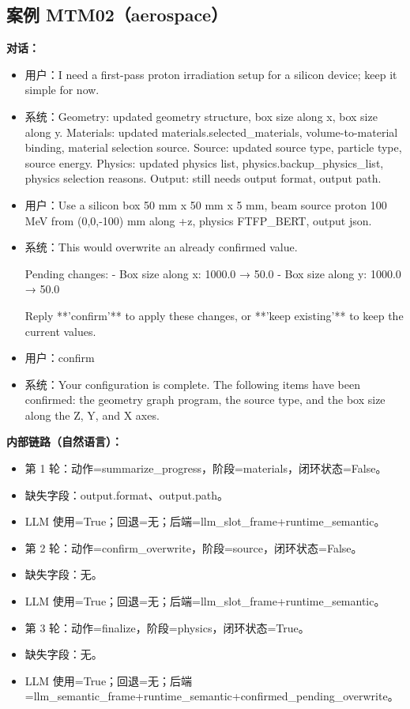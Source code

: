 \documentclass[11pt]{ctexart}
\begin{document}
\subsection{案例 MTM02（aerospace）}
\textbf{对话：}
\begin{itemize}
\item 用户：I need a first-pass proton irradiation setup for a silicon device; keep it simple for now.
\item 系统：Geometry: updated geometry structure, box size along x, box size along y. Materials: updated materials.selected\_materials, volume-to-material binding, material selection source. Source: updated source type, particle type, source energy. Physics: updated physics list, physics.backup\_physics\_list, physics selection reasons. Output: still needs output format, output path.
\item 用户：Use a silicon box 50 mm x 50 mm x 5 mm, beam source proton 100 MeV from (0,0,-100) mm along +z, physics FTFP\_BERT, output json.
\item 系统：This would overwrite an already confirmed value.

Pending changes:
- Box size along x: 1000.0 → 50.0
- Box size along y: 1000.0 → 50.0

Reply **'confirm'** to apply these changes, or **'keep existing'** to keep the current values.
\item 用户：confirm
\item 系统：Your configuration is complete. The following items have been confirmed: the geometry graph program, the source type, and the box size along the Z, Y, and X axes.
\end{itemize}
\textbf{内部链路（自然语言）：}
\begin{itemize}
\item 第 1 轮：动作=summarize\_progress，阶段=materials，闭环状态=False。
\item 缺失字段：output.format、output.path。
\item LLM 使用=True；回退=无；后端=llm\_slot\_frame+runtime\_semantic。
\item 第 2 轮：动作=confirm\_overwrite，阶段=source，闭环状态=False。
\item 缺失字段：无。
\item LLM 使用=True；回退=无；后端=llm\_slot\_frame+runtime\_semantic。
\item 第 3 轮：动作=finalize，阶段=physics，闭环状态=True。
\item 缺失字段：无。
\item LLM 使用=True；回退=无；后端=llm\_semantic\_frame+runtime\_semantic+confirmed\_pending\_overwrite。
\end{itemize}
\end{document}
